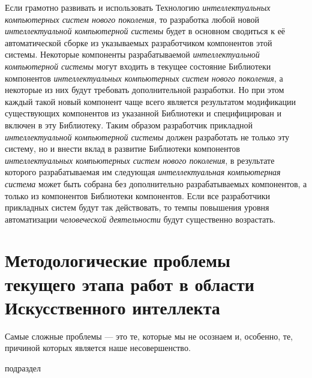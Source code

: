 \begin{textitemize}
\begin{textitemize}
		Если грамотно развивать и использовать Технологию \textit{интеллектуальных компьютерных систем нового поколения}, то разработка любой новой \textit{интеллектуальной компьютерной системы} будет в основном сводиться к её автоматической сборке из указываемых разработчиком компонентов этой системы. Некоторые компоненты разрабатываемой \textit{интеллектуальной компьютерной системы} могут входить в текущее состояние Библиотеки компонентов \textit{интеллектуальных компьютерных систем нового поколения}, а некоторые из них будут требовать дополнительной разработки. Но при этом каждый такой новый компонент чаще всего является результатом модификации существующих компонентов из  указанной Библиотеки и  специфицирован и включен в эту Библиотеку. Таким образом разработчик прикладной \textit{интеллектуальной компьютерной системы} должен разработать не только эту систему, но и внести вклад в развитие Библиотеки компонентов \textit{интеллектуальных компьютерных систем нового поколения}, в результате которого разрабатываемая им следующая \textit{интеллектуальная компьютерная система} может быть собрана без дополнительно разрабатываемых компонентов, а только из компонентов Библиотеки компонентов. Если все разработчики прикладных систем будут так действовать, то темпы повышения уровня автоматизации \textit{человеческой деятельности} будут существенно возрастать.
	\end{textitemize}
\end{textitemize}

\section*{Методологические проблемы текущего этапа работ в области Искусственного интеллекта}
\label{concl_methodological_problems_current_stage_work_field_AI}

\begin{SCn}
	{Самые сложные проблемы --- это те, которые мы не осознаем и, особенно, те, причиной которых является наше несовершенство.
	}
	
	\begin{scnrelfromlist}{подраздел}
	\end{scnrelfromlist}
\end{SCn}

